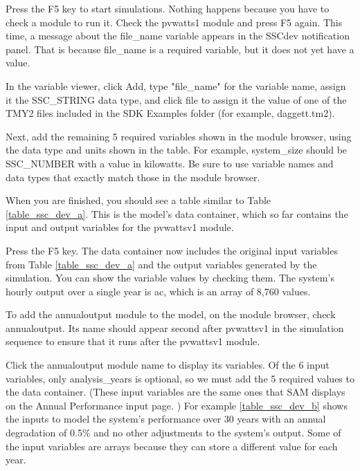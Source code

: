 \documentclass{article}
\begin{document}
Press the F5 key to start simulations. Nothing happens because you have to check a module to run it. Check the pvwatts1 module and press F5 again. This time, a message about the file\_name variable appears in the SSCdev notification panel. That is because file\_name is a required variable, but it does not yet have a value.

In the variable viewer, click Add, type "file\_name" for the variable name, assign it the SSC\_STRING data type, and click file to assign it the value of one of the TMY2 files included in the SDK Examples folder (for example, daggett.tm2).

Next, add the remaining 5 required variables shown in the module browser, using the data type and units shown in the table. For example, system\_size should be SSC\_NUMBER with a value in kilowatts. Be sure to use variable names and data types that exactly match those in the module browser.

When you are finished, you should see a table similar to Table \ref{table_ssc_dev_a}. This is the model's data container, which so far contains the input and output variables for the pvwattsv1 module.

Press the F5 key. The data container now includes the original input variables from Table \ref{table_ssc_dev_a} and the output variables generated by the simulation. You can show the variable values by checking them. The system's hourly output over a single year is ac, which is an array of 8,760 values.

To add the annualoutput module to the model, on the module browser, check annualoutput. Its name should appear second after pvwattsv1 in the simulation sequence to ensure that it runs after the pvwattsv1 module.

Click the annualoutput module name to display its variables. Of the 6 input variables, only analysis\_years is optional, so we must add the 5 required values to the data container. (These input variables are the same ones that SAM displays on the Annual Performance input page. ) For example \ref{table_ssc_dev_b} shows the inputs to model the system's performance over 30 years with an annual degradation of 0.5\% and no other adjustments to the system's output. Some of the input variables are arrays because they can store a different value for each year.
\end{document}
